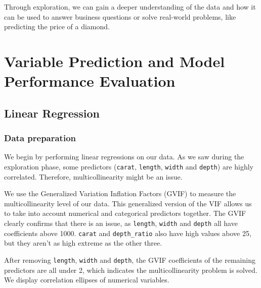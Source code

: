 \documentclass[
  paper=a4,
  ,captions=tableheading
]{scrartcl}
\begin{document}
Through exploration, we can gain a deeper understanding of the data and
how it can be used to answer business questions or solve real-world
problems, like predicting the price of a diamond.

\hypertarget{variable-prediction-and-model-performance-evaluation}{%
\section{Variable Prediction and Model Performance
Evaluation}\label{variable-prediction-and-model-performance-evaluation}}

\hypertarget{linear-regression}{%
\subsection{Linear Regression}\label{linear-regression}}

\hypertarget{data-preparation}{%
\subsubsection{Data preparation}\label{data-preparation}}

We begin by performing linear regressions on our data. As we saw during
the exploration phase, some predictors (\texttt{carat}, \texttt{length},
\texttt{width} and \texttt{depth}) are highly correlated. Therefore,
multicollinearity might be an issue.

We use the Generalized Variation Inflation Factors (GVIF) to measure the
multicollinearity level of our data. This generalized version of the VIF
allows us to take into account numerical and categorical predictors
together. The GVIF clearly confirms that there is an issue, as
\texttt{length}, \texttt{width} and \texttt{depth} all have coefficients
above 1000. \texttt{carat} and \texttt{depth\_ratio} also have high
values above 25, but they aren't as high extreme as the other three.

After removing \texttt{length}, \texttt{width} and \texttt{depth}, the
GVIF coefficients of the remaining predictors are all under 2, which
indicates the multicollinearity problem is solved. We display
correlation ellipses of numerical variables.
\end{document}

